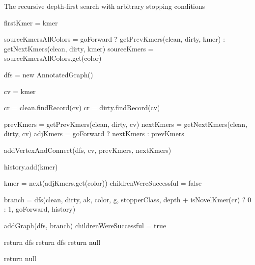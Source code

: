 \begin{algorithm}
\caption{The recursive depth-first search with arbitrary stopping conditions}
\label{alg:rdfs}
\begin{algorithmic}[1]
    \State firstKmer = kmer

    \State sourceKmersAllColors = goForward ? getPrevKmers(clean, dirty, kmer) : getNextKmers(clean, dirty, kmer)
    \State sourceKmers = sourceKmersAllColors.get(color)

    \State dfs = new AnnotatedGraph()

    \Repeat
        \State cv = kmer

        \State cr = clean.findRecord(cv)
            \State cr = dirty.findRecord(cv)
        \EndIf

        \State prevKmers = getPrevKmers(clean, dirty, cv)
        \State nextKmers = getNextKmers(clean, dirty, cv)
        \State adjKmers  = goForward ? nextKmers : prevKmers

        \State addVertexAndConnect(dfs, cv, prevKmers, nextKmers)

            \State history.add(kmer)

                \State kmer = next(adjKmers.get(color))
                \State childrenWereSuccessful = false

                    \State branch = dfs(clean, dirty, ak, color, g, stopperClass, depth + isNovelKmer(cr) ? 0 : 1, goForward, history)

                        \State addGraph(dfs, branch)
                        \State childrenWereSuccessful = true
                    \EndIf
                \EndFor

                    \State return dfs
                \EndIf
            \EndIf
            \State return dfs
        \Else
            \State return null
        \EndIf

    \State return null
\EndFunction
\end{algorithmic}
\end{algorithm}

